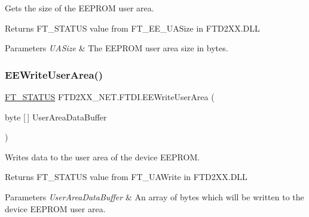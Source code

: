 Gets the size of the E\+E\+P\+R\+OM user area. 

\begin{DoxyReturn}{Returns}
F\+T\+\_\+\+S\+T\+A\+T\+US value from F\+T\+\_\+\+E\+E\+\_\+\+U\+A\+Size in F\+T\+D2\+X\+X.\+D\+LL
\end{DoxyReturn}

\begin{DoxyParams}{Parameters}
{\em U\+A\+Size} & The E\+E\+P\+R\+OM user area size in bytes.\\
\hline
\end{DoxyParams}
\mbox{\label{class_f_t_d2_x_x___n_e_t_1_1_f_t_d_i_ab1242eaf2a805bfd250039654b406fdd}} 
\subsubsection{\texorpdfstring{EEWriteUserArea()}{EEWriteUserArea()}}
{\footnotesize\ttfamily \mbox{\hyperlink{class_f_t_d2_x_x___n_e_t_1_1_f_t_d_i_aabe20ad905cc4ccc1e35dd5b877d9a83}{F\+T\+\_\+\+S\+T\+A\+T\+US}} F\+T\+D2\+X\+X\+\_\+\+N\+E\+T.\+F\+T\+D\+I.\+E\+E\+Write\+User\+Area (\begin{DoxyParamCaption}\item[{byte \mbox{[}$\,$\mbox{]}}]{User\+Area\+Data\+Buffer }\end{DoxyParamCaption})}



Writes data to the user area of the device E\+E\+P\+R\+OM. 

\begin{DoxyReturn}{Returns}
F\+T\+\_\+\+S\+T\+A\+T\+US value from F\+T\+\_\+\+U\+A\+Write in F\+T\+D2\+X\+X.\+D\+LL
\end{DoxyReturn}

\begin{DoxyParams}{Parameters}
{\em User\+Area\+Data\+Buffer} & An array of bytes which will be written to the device E\+E\+P\+R\+OM user area.\\
\hline
\end{DoxyParams}
\mbox{\label{class_f_t_d2_x_x___n_e_t_1_1_f_t_d_i_a32056325577415f3f99420a1b81f4965}} 
